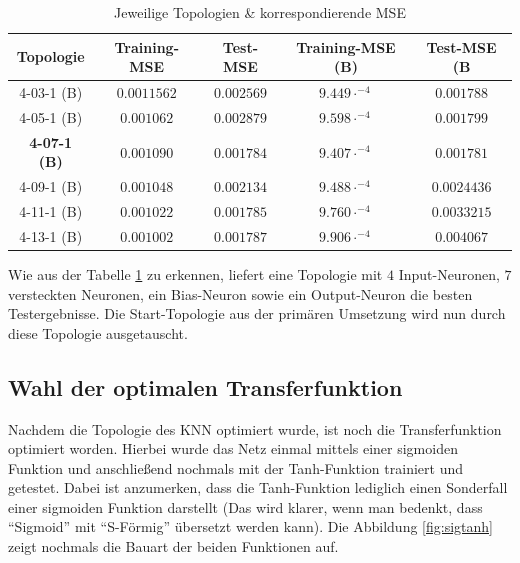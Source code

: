 \begin{table}[H]
  \centering
  \begin{tabular}{|c|c|c|c|c|}
  \hline 
  \rule[0ex]{0pt}{2.5ex} \textbf{Topologie}& \textbf{Training-MSE} & \textbf{Test-MSE} & \textbf{Training-MSE (B)} & \textbf{Test-MSE (B}\\ 
  \hline 
  \rule[0ex]{0pt}{2.5ex} 4-03-1 (B)& $0.0011562$& $0.002569$ & $9.449 \cdot^{-4}$ & $0.001788$\\ 
  \hline 
  \rule[0ex]{0pt}{2.5ex} 4-05-1 (B)& $0.001062$ & $0.002879$ & $9.598 \cdot^{-4}$ & $0.001799$\\ 
  \hline 
  \rule[0ex]{0pt}{2.5ex} \textbf{4-07-1 (B)}& $0.001090$ & $0.001784$ & $9.407\cdot^{-4}$ & $0.001781$\\ 
  \hline 
  \rule[0ex]{0pt}{2.5ex} 4-09-1 (B)& $0.001048$ & $0.002134$ & $9.488\cdot^{-4}$ & $0.0024436$\\ 
  \hline 
  \rule[0ex]{0pt}{2.5ex} 4-11-1 (B)& $0.001022$ & $0.001785$ & $9.760\cdot^{-4}$ & $0.0033215$\\ 
  \hline 
  \rule[0ex]{0pt}{2.5ex} 4-13-1 (B)& $0.001002$ & $0.001787$ & $9.906\cdot^{-4}$ & $0.004067$\\ 
  \hline 
  \end{tabular} 
  \caption{Jeweilige Topologien \& korrespondierende MSE}
  \label{tab:TOPMSE}
\end{table}

Wie aus der Tabelle \ref{tab:TOPMSE} zu erkennen, liefert eine Topologie mit $4$ Input-Neuronen, $7$ versteckten Neuronen, ein Bias-Neuron sowie ein Output-Neuron die besten Testergebnisse. Die Start-Topologie aus der primären Umsetzung wird nun durch diese Topologie ausgetauscht.

\subsection{Wahl der optimalen Transferfunktion} 
\label{subsection:Wahl der optimalen Transferfunktion} 

Nachdem die Topologie des KNN optimiert wurde, ist noch die Transferfunktion optimiert worden. Hierbei wurde das Netz einmal mittels einer sigmoiden Funktion und anschließend nochmals mit der Tanh-Funktion trainiert und getestet. Dabei ist anzumerken, dass die Tanh-Funktion lediglich einen Sonderfall einer sigmoiden Funktion darstellt (Das wird klarer, wenn man bedenkt, dass "`Sigmoid"' mit "`S-Förmig"' übersetzt werden kann). Die Abbildung \ref{fig:sigtanh}
zeigt nochmals die Bauart der beiden Funktionen auf.

